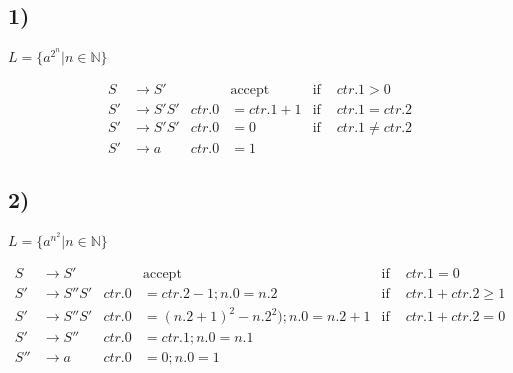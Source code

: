 \subsection*{1)}

$L = \lbrace a^{2^n} | n \in \mathbb{N} \rbrace$

\begin{equation*}
 	\begin{aligned}
 		S &\rightarrow S' & & \text{accept} &\text{if }& ctr.1 > 0 \\
 		S' &\rightarrow S'S' & ctr.0 &= ctr.1 + 1 &\text{if }& ctr.1 = ctr.2 \\
 		S' &\rightarrow S'S' & ctr.0 &= 0 &\text{if }& ctr.1 \not= ctr.2 \\
 		S' &\rightarrow a & ctr.0 &= 1&&
	\end{aligned}
\end{equation*}

\subsection*{2)}

$L = \lbrace a^{n^2} | n \in \mathbb{N} \rbrace$

\begin{equation*}
 	\begin{aligned}
 		S &\rightarrow S' & & \text{accept} &\text{if }& ctr.1 = 0 \\
 		S' &\rightarrow S''S' & ctr.0 &= ctr.2 - 1; n.0 = n.2 &\text{if }& ctr.1 + ctr.2 \geq 1 \\
 		S' &\rightarrow S''S' & ctr.0 &= (n.2 + 1)^2 - n.2^2); n.0 = n.2 + 1 &\text{if }& ctr.1 + ctr.2 = 0 \\
 		S' &\rightarrow S'' & ctr.0 &= ctr.1; n.0 = n.1 & \\
 		S'' &\rightarrow a & ctr.0 &= 0; n.0 = 1&&
	\end{aligned}
\end{equation*}
